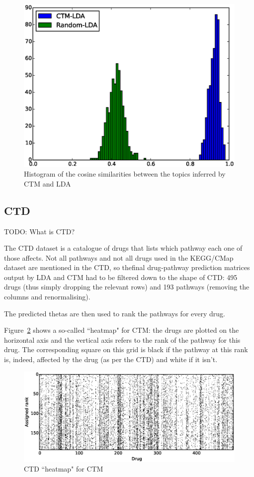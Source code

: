 \documentclass[12pt,a4paper,twoside,openright]{report}
\begin{document}
\begin{figure}[!htb]
\includegraphics[width=\textwidth]{ctd-ctm-lda-diffs.eps}
\caption{Histogram of the cosine similarities between the topics inferred by CTM and LDA}
\label{fig:ctd-ctm-lda-diffs}
\end{figure}

\subsection{CTD}

TODO: What is CTD?

The CTD dataset is a catalogue of drugs that lists which pathway each one of those affects. Not all pathways and not all drugs used in the KEGG/CMap dataset are mentioned in the CTD, so thefinal drug-pathway prediction matrices output by LDA and CTM had to be filtered down to the shape of CTD: 495 drugs (thus simply dropping the relevant rows) and 193 pathways (removing the columns and renormalising).

The predicted thetas are then used to rank the pathways for every drug.

Figure~\ref{fig:ctm-ctd-heatmap} shows a so-called ``heatmap" for CTM: the drugs are plotted on the horizontal axis and the vertical axis refers to the rank of the pathway for this drug. The corresponding square on this grid is black if the pathway at this rank is, indeed, affected by the drug (as per the CTD) and white if it isn't.

\begin{figure}[!htb]
\includegraphics[width=\textwidth]{ctm-ctd-heatmap.eps}
\caption{CTD ``heatmap" for CTM}
\label{fig:ctm-ctd-heatmap}
\end{figure}
\end{document}

